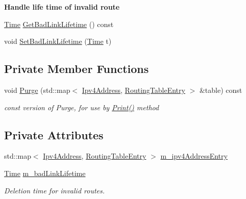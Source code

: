 \begin{Indent}{\bf Handle life time of invalid route}\par
\begin{DoxyCompactItemize}
\item 
\hyperlink{classns3_1_1Time}{Time} \hyperlink{classns3_1_1aodv_1_1RoutingTable_a25cee8370e9f9f998b72536ab1943046}{Get\+Bad\+Link\+Lifetime} () const 
\item 
void \hyperlink{classns3_1_1aodv_1_1RoutingTable_a9cb76d2a19804c4c7b04c858370404c7}{Set\+Bad\+Link\+Lifetime} (\hyperlink{classns3_1_1Time}{Time} t)
\end{DoxyCompactItemize}
\end{Indent}
\subsection*{Private Member Functions}
\begin{DoxyCompactItemize}
\item 
void \hyperlink{classns3_1_1aodv_1_1RoutingTable_ab31f90138c7f02ce5597311dc72ea4dc}{Purge} (std\+::map$<$ \hyperlink{classns3_1_1Ipv4Address}{Ipv4\+Address}, \hyperlink{classns3_1_1aodv_1_1RoutingTableEntry}{Routing\+Table\+Entry} $>$ \&table) const 
\begin{DoxyCompactList}\small\item\em const version of Purge, for use by \hyperlink{classns3_1_1aodv_1_1RoutingTable_a96ea03f8cb07c9cdedb43e08bc000ae7}{Print()} method \end{DoxyCompactList}\end{DoxyCompactItemize}
\subsection*{Private Attributes}
\begin{DoxyCompactItemize}
\item 
std\+::map$<$ \hyperlink{classns3_1_1Ipv4Address}{Ipv4\+Address}, \hyperlink{classns3_1_1aodv_1_1RoutingTableEntry}{Routing\+Table\+Entry} $>$ \hyperlink{classns3_1_1aodv_1_1RoutingTable_adb33ba98f0792226c0f1ea7f260f3139}{m\+\_\+ipv4\+Address\+Entry}
\item 
\hyperlink{classns3_1_1Time}{Time} \hyperlink{classns3_1_1aodv_1_1RoutingTable_a51bd9310a9318a82e49d943fba7b8577}{m\+\_\+bad\+Link\+Lifetime}
\begin{DoxyCompactList}\small\item\em Deletion time for invalid routes. \end{DoxyCompactList}\end{DoxyCompactItemize}


